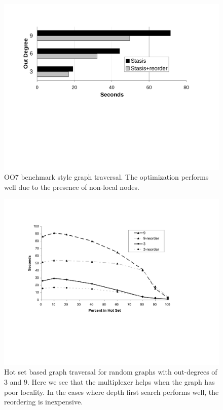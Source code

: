 \documentclass[letterpaper,twocolumn,10pt]{article}
\begin{document}
\begin{figure}[t]
\includegraphics[width=1\columnwidth]{figs/oo7.pdf}
\vspace{-15pt}
\caption{\sf\label{fig:oo7} OO7 benchmark style graph traversal.  The optimization performs well due to the presence of non-local nodes.}
\end{figure}

\begin{figure}[t]
\includegraphics[width=1\columnwidth]{figs/trans-closure-hotset.pdf}
\vspace{-12pt}
\caption{\sf\label{fig:hotGraph} Hot set based graph traversal for random graphs with out-degrees of 3 and 9.  Here
we see that the multiplexer helps when the graph has poor locality.
In the cases where depth first search performs well, the
reordering is inexpensive.}
\end{figure}
\end{document}
